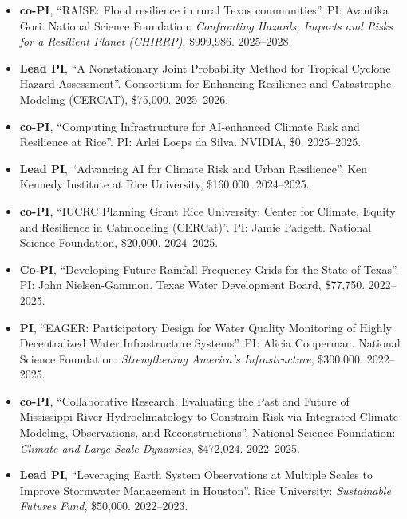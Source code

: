 \documentclass[10pt,oneside]{article}
\begin{document}
\begin{itemize}[label={}]

  \item \textbf{co-PI}, \enquote{RAISE: Flood resilience in rural Texas communities}.  PI: Avantika Gori. National Science Foundation: \textit{Confronting Hazards, Impacts and Risks for a Resilient Planet (CHIRRP)}, \$999,986. 2025--2028.

  \item \textbf{Lead PI}, \enquote{A Nonstationary Joint Probability Method for Tropical Cyclone Hazard Assessment}.  Consortium for Enhancing Resilience and Catastrophe Modeling (CERCAT), \$75,000. 2025--2026.

  \item \textbf{co-PI}, \enquote{Computing Infrastructure for AI-enhanced Climate Risk and Resilience at Rice}.  PI: Arlei Loeps da Silva. NVIDIA, \$0. 2025--2025.

  \item \textbf{Lead PI}, \enquote{Advancing AI for Climate Risk and Urban Resilience}.  Ken Kennedy Institute at Rice University, \$160,000. 2024--2025.

  \item \textbf{co-PI}, \enquote{IUCRC Planning Grant Rice University: Center for Climate, Equity and Resilience in Catmodeling (CERCat)}.  PI: Jamie Padgett. National Science Foundation, \$20,000. 2024--2025.

  \item \textbf{Co-PI}, \enquote{Developing Future Rainfall Frequency Grids for the State of Texas}.  PI: John Nielsen-Gammon. Texas Water Development Board, \$77,750. 2022--2025.

  \item \textbf{PI}, \enquote{EAGER: Participatory Design for Water Quality Monitoring of Highly Decentralized Water Infrastructure Systems}.  PI: Alicia Cooperman. National Science Foundation: \textit{Strengthening America's Infrastructure}, \$300,000. 2022--2025.

  \item \textbf{co-PI}, \enquote{Collaborative Research: Evaluating the Past and Future of Mississippi River Hydroclimatology to Constrain Risk via Integrated Climate Modeling, Observations, and Reconstructions}.  National Science Foundation: \textit{Climate and Large-Scale Dynamics}, \$472,024. 2022--2025.

  \item \textbf{Lead PI}, \enquote{Leveraging Earth System Observations at Multiple Scales to Improve Stormwater Management in Houston}.  Rice University: \textit{Sustainable Futures Fund}, \$50,000. 2022--2023.


\end{itemize}
\end{document}
